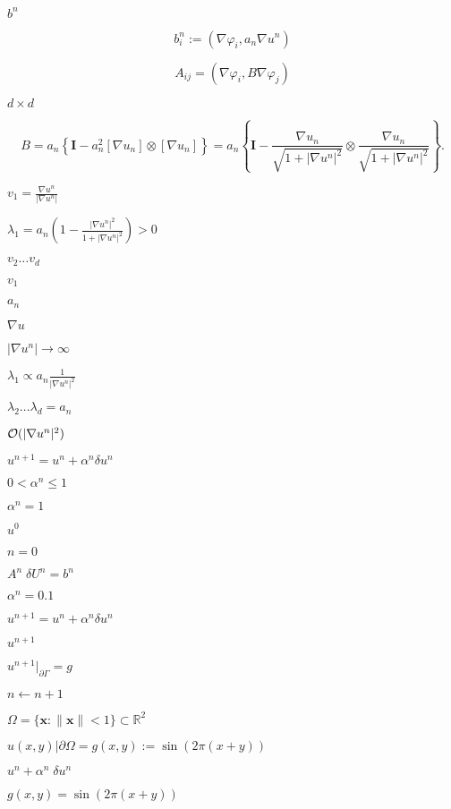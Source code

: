 \documentclass{article}
\begin{document}
$b^{n}$
\pagebreak

\[ b^{n}_{i}:=\left( \nabla \varphi_{i} , a_{n} \nabla u^{n}\right) \]
\pagebreak

\[ A_{ij} = \left( \nabla \varphi_i, B \nabla \varphi_j \right) \]
\pagebreak

$d \times d$
\pagebreak

\[ B = a_n \left\{ \mathbf I - a_n^2 [\nabla u_n] \otimes [\nabla u_n] \right\} = a_n \left\{ \mathbf I - \frac{\nabla u_n}{\sqrt{1+|\nabla u^{n}|^{2}}} \otimes \frac{\nabla u_n}{\sqrt{1+|\nabla u^{n}|^{2}}} \right\}. \]
\pagebreak

$v_1 = \frac{\nabla u^n}{|\nabla u^n|}$
\pagebreak

$\lambda_1=a_n \left(1-\frac{|\nabla u^n|^2}{1+|\nabla u^n|^2}\right) > 0$
\pagebreak

$v_2\ldots v_d$
\pagebreak

$v_1$
\pagebreak

$a_n$
\pagebreak

$\nabla u$
\pagebreak

$|\nabla u^n|\rightarrow\infty$
\pagebreak

$\lambda_1 \propto a_n \frac{1}{|\nabla u^n|^2}$
\pagebreak

$\lambda_2\ldots \lambda_d=a_n$
\pagebreak

${\cal O}(|\nabla u^n|^2)$
\pagebreak

$u^{n+1} = u^{n}+\alpha^n \delta u^{n}$
\pagebreak

$0 < \alpha^n \le 1$
\pagebreak

$\alpha^n=1$
\pagebreak

$u^0$
\pagebreak

$n=0$
\pagebreak

$A^{n}\;\delta U^{n}=b^{n}$
\pagebreak

$\alpha^n=0.1$
\pagebreak

$u^{n+1}=u^{n}+\alpha^n \delta u^{n}$
\pagebreak

$u^{n+1}$
\pagebreak

$u^{n+1}|_{\partial\Gamma}=g$
\pagebreak

$n\leftarrow n+1$
\pagebreak

$\Omega=\{\mathbf x: \|\mathbf x\|<1\}\subset {\mathbb R}^2$
\pagebreak

$u(x,y)|{\partial\Omega} = g(x,y):=\sin(2 \pi (x+y))$
\pagebreak

$u^n + \alpha^n \; \delta u^n$
\pagebreak

$g(x,y)=\sin(2 \pi (x+y))$
\pagebreak
\end{document}
